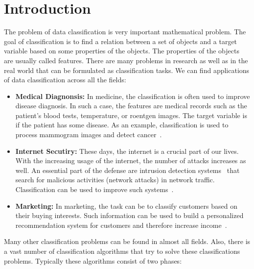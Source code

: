\chapter{Introduction}

The problem of data classification is very important mathematical problem. The goal of classification is to find a relation between a set of objects and a target variable based on some properties of the objects. The properties of the objects are usually called features. There are many problems in research as well as in the real world that can be formulated as classification tasks. We can find applications of data classification across all the fields:
\begin{itemize}
  \item \textbf{Medical Diagnonsis:} In medicine, the classification is often used to improve disease diagnosis. In such a case, the features are medical records such as the patient's blood tests, temperature, or roentgen images. The target variable is if the patient has some disease. As an example, classification is used to process mammogram images and detect cancer~\cite{viale2012current, levy2016breast}.
  \item \textbf{Internet Secutiry:} These days, the internet is a crucial part of our lives. With the increasing usage of the internet, the number of attacks increases as well. An essential part of the defense are intrusion detection systems~\cite{grill2016learning, scarfone2007guide} that search for malicious activities (network attacks) in network traffic. Classification can be used to improve such systems~\cite{giacinto2002intrusion, shanbhag2009accurate}.
  \item \textbf{Marketing:} In marketing, the task can be to classify customers based on their buying interests. Such information can be used to build a personalized recommendation system for customers and therefore increase income~\cite{kaefer2005neural, zhang2007building}.
\end{itemize}
Many other classification problems can be found in almost all fields. Also, there is a vast number of classification algorithms that try to solve these classifications problems. Typically these algorithms consist of two phases:
